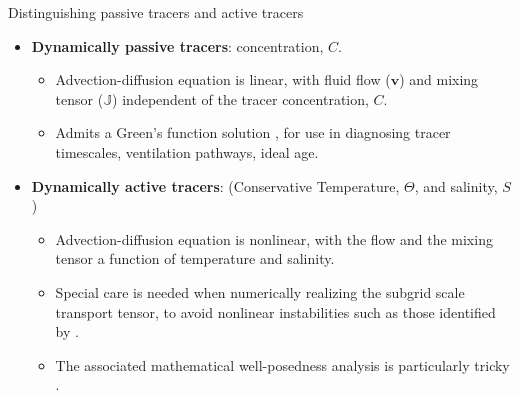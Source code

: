 \documentclass{beamer}
\begin{document}
\begin{frame}{Distinguishing passive tracers and active tracers}

\begin{itemize}

\item[$\star$] {\bf Dynamically passive tracers}:
  concentration, $C$.
  \begin{itemize}
   \item[$\bullet$] Advection-diffusion equation is linear, with fluid
     flow (${\bm v}$) and mixing tensor ($\mathbb{J}$) independent of
     the tracer concentration, $C$.
    \item[$\bullet$] Admits a Green's function solution
      \parencite{Haine_etal2025}, for use in diagnosing tracer
      timescales, ventilation pathways, ideal age.
   \end{itemize}
  

\item[$\star$] {\bf Dynamically active tracers}: (Conservative
  Temperature, $\Theta$, and salinity, $S$)
  \begin{itemize}
  \item[$\bullet$] Advection-diffusion equation is nonlinear, with the
    flow and the mixing tensor a function of temperature and salinity.
  \item[$\bullet$] Special care is needed when numerically realizing
    the subgrid scale transport tensor, to avoid nonlinear
    instabilities such as those identified by
    \textcite{GriffiesIsoneutral}.
  \item [$\bullet$] The associated mathematical well-posedness
    analysis is particularly tricky \parencite{KornTiti2024}.
  \end{itemize}
  
\end{itemize}

\end{frame}
\end{document}
